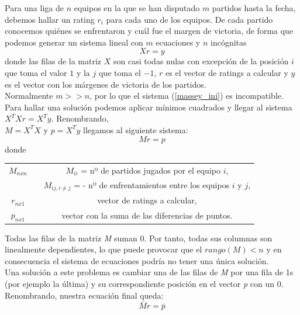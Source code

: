 Para una liga de $n$ equipos en la que se han disputado $m$ partidos hasta la fecha, debemos hallar un rating $r_{i}$ para cada uno de los equipos. De cada partido conocemos quiénes se enfrentaron y cuál fue el margen de victoria, de forma que podemos generar un sistema lineal con $m$ ecuaciones y $n$ incógnitas 
\begin{equation}\label{massey_ini}
	Xr=y
\end{equation}
donde las filas de la matriz $X$ son casi todas nulas con excepción de la posición $i$ que toma el valor $1$ y la $j$ que toma el $-1$, $r$ es el vector de ratings a calcular y $y$ es el vector con los márgenes de victoria de los partidos.\\

Normalmente $m > > n$, por lo que el sistema (\ref{massey_ini}) es incompatible. Para hallar una solución podemos aplicar mínimos cuadrados y llegar al sistema $X^{T}Xr=X^{T}y$. Renombrando,\\ $M=X^{T}X$ y $p=X^{T}y$ llegamos al siguiente sistema:
\begin{equation}
	Mr = p
\end{equation}
donde 
\begin{center}
	\begin{tabular}{ccc}
	\hline $M_{nxn}$ & & $M_{ii}$ = nº de partidos jugados por el equipo $i$, \\
	& & $M_{ij, i \neq j}$ = - nº de enfrentamientos entre los equipos $i$ y $j$,\\ 
	\hline  $r_{nx1}$ & & vector de ratings a calcular, \\ 
	\hline  $p_{nx1}$ & & vector con la suma de las diferencias de puntos.\\ 
	\hline 
\end{tabular}
\end{center} 

Todas las filas de la matriz \textit{M} suman 0. Por tanto, todas sus columnas son linealmente dependientes, lo que puede provocar que el $rango(M)<n$ y en consecuencia el sistema de ecuaciones podría no tener una única solución.\\

Una solución a este problema es cambiar una de las filas de \textit{M} por una fila de 1s (por ejemplo la última) y su correspondiente posición en el vector \textit{p} con un 0.
Renombrando, nuestra ecuación final queda:
\begin{equation}
	\bar{M}r = \bar{p}
\end{equation}

